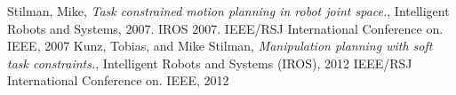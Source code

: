 \documentclass[12pt]{article}
\begin{document}
\begin{thebibliography}{50}
   Stilman, Mike, \textsl{Task constrained motion planning in robot joint space.}, Intelligent Robots and Systems, 2007. IROS 2007. IEEE/RSJ International Conference on. IEEE, 2007
   Kunz, Tobias, and Mike Stilman, \textsl{Manipulation planning with soft task constraints.}, Intelligent Robots and Systems (IROS), 2012 IEEE/RSJ International Conference on. IEEE, 2012
\end{thebibliography}

\newpage
\end{document}
